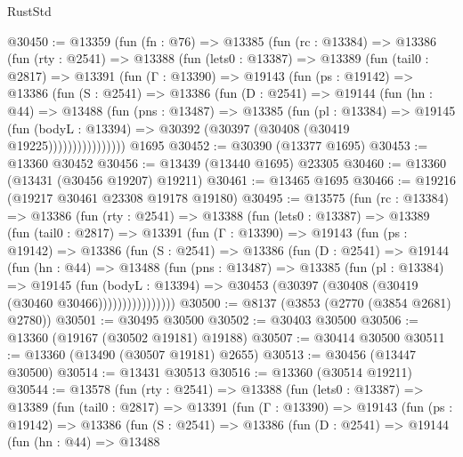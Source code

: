 \begin{lexlean}{RustStd}
\begin{coremodule}
@30450 := @13359
    (fun (fn : @76) =>
    @13385
      (fun (rc : @13384) =>
      @13386
        (fun (rty : @2541) =>
        @13388
          (fun (lets0 : @13387) =>
          @13389
            (fun (tail0 : @2817) =>
            @13391
              (fun (Γ : @13390) =>
              @19143
                (fun (ps : @19142) =>
                @13386
                  (fun (S : @2541) =>
                  @13386
                    (fun (D : @2541) =>
                    @19144
                      (fun (hn : @44) =>
                      @13488
                        (fun (pns : @13487) =>
                        @13385
                          (fun (pl : @13384) =>
                          @19145
                            (fun (bodyL : @13394) =>
                            @30392 (@30397 (@30408 (@30419 @19225))))))))))))))))
    @1695
@30452 := @30390 (@13377 @1695)
@30453 := @13360 @30452
@30456 := @13439 (@13440 @1695) @23305
@30460 := @13360 (@13431 (@30456 @19207) @19211)
@30461 := @13465 @1695
@30466 := @19216 (@19217 @30461 @23308 @19178 @19180)
@30495 := @13575
    (fun (rc : @13384) =>
    @13386
      (fun (rty : @2541) =>
      @13388
        (fun (lets0 : @13387) =>
        @13389
          (fun (tail0 : @2817) =>
          @13391
            (fun (Γ : @13390) =>
            @19143
              (fun (ps : @19142) =>
              @13386
                (fun (S : @2541) =>
                @13386
                  (fun (D : @2541) =>
                  @19144
                    (fun (hn : @44) =>
                    @13488
                      (fun (pns : @13487) =>
                      @13385
                        (fun (pl : @13384) =>
                        @19145
                          (fun (bodyL : @13394) =>
                          @30453 (@30397 (@30408 (@30419 (@30460 @30466))))))))))))))))
@30500 := @8137 (@3853 (@2770 (@3854 @2681) @2780))
@30501 := @30495 @30500
@30502 := @30403 @30500
@30506 := @13360 (@19167 (@30502 @19181) @19188)
@30507 := @30414 @30500
@30511 := @13360 (@13490 (@30507 @19181) @2655)
@30513 := @30456 (@13447 @30500)
@30514 := @13431 @30513
@30516 := @13360 (@30514 @19211)
@30544 := @13578
    (fun (rty : @2541) =>
    @13388
      (fun (lets0 : @13387) =>
      @13389
        (fun (tail0 : @2817) =>
        @13391
          (fun (Γ : @13390) =>
          @19143
            (fun (ps : @19142) =>
            @13386
              (fun (S : @2541) =>
              @13386
                (fun (D : @2541) =>
                @19144
                  (fun (hn : @44) =>
                  @13488

\end{coremodule}
\end{lexlean}
